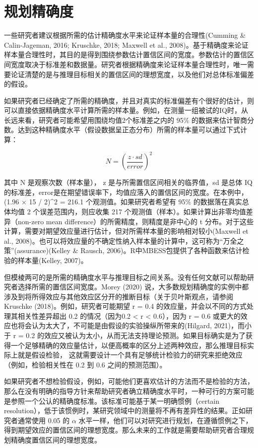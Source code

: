 \documentclass[
  letterpaper,
  DIV=11,
  numbers=noendperiod]{scrreprt}
\begin{document}
\hypertarget{planprecision}{%
\section{规划精确度}\label{planprecision}}

一些研究者建议根据所需的估计精确度水平来论证样本量的合理性(Cumming \&
Calin-Jageman, 2016; Kruschke, 2018; Maxwell et al.,
2008)。基于精确度来论证样本量合理性时，其目的是得到围绕参数估计置信区间的宽度。参数估计的置信区间宽度取决于标准差和数据量。研究者根据精确度来论证样本量合理性时，唯一需要论证清楚的是与推理目标相关的置信区间的理想宽度，以及他们对总体标准偏差的假设。

如果研究者已经确定了所需的精确度，并且对真实的标准偏差有个很好的估计，则可以直接依据精确度水平计算所需的样本量。例如，在测量一组被试的IQ时，从长远来看，研究者可能希望用围绕均值2个标准差之内的
95\%
的数据来估计智商分数。达到这种精确度水平（假设数据呈正态分布）所需的样本量可以通过下式计算：

\[N = \left(\frac{z \cdot sd}{error}\right)^2\]

其中 N 是观察次数（样本量）， z 是与所需置信区间相关的临界值，sd 是总体
IQ
的标准差，error是在期望错误率下，均值应落入的置信区间的宽度。在本例中，(1.96
× 15 / 2)\^{}2 = 216.1 个观测值。如果研究者希望有 95\%
的数据落在真实总体均值 2 个误差范围内，则应收集 217
个观测值（样本）。如果计算出非零均值差异（non-zero mean
difference）的所需精度，则精度是非中心的 t
分布。对于这些计算，需要对期望效应量进行估计，但对所需样本量的影响相对较小(Maxwell
et al.,
2008)。也可以将效应量的不确定性纳入样本量的计算中，这可称为``万全之策''(assurance)(Kelley
\& Rausch, 2006)。R中MBESS包提供了各种函数来估计检验的样本量(Kelley,
2007)。

但模棱两可的是所需的精确度水平与推理目标之间关系。没有任何文献可以帮助研究者选择所需的置信区间宽度。Morey
(2020)
说，大多数规划精确度的实例中都涉及到将所得效应与其他效应区分开的推断目标（关于贝叶斯观点，请参阅
Kruschke (2018)。例如，研究者可能期望 r = 0.4
的效应量，并会以不同的方式处理其相关性差异超出 0.2 的情况（因为0.2
\textless{} r \textless{} 0.6），因为 r = 0.6
或更大的效应也将会认为太大了，不可能是由假设的实验操纵所带来的(Hilgard,
2021)，而小于 r = 0.2
的效应又被认为太小，从而无法支持理论预测。如果目标确实是为了获得一个足够精确的效应量估计，以便高概率的区分上述两种效应，那么推理目标实际上就是假设检验，
这就需要设计一个具有足够统计检验力的研究来拒绝效应（例如，检验相关性在
0.2 到 0.6 之间的预测范围）。

如果研究者不想检验假设，例如，可能他们更喜欢估计的方法而不是检验的方法，那么在没有明确的指导方针来帮助研究者确立精确度水平时，一种可行的方案可能是参照一个公认的精确度标准。该标准可能基于某一明确惯例（certain
resolution），低于该惯例时，某研究领域中的测量将不再有差异性的结果。正如研究者通常使用
0.05 的 \(\alpha\)
水平一样，他们可以对研究进行规划，在遵循惯例之下，得到期望效应的置信区间的理想宽度。那么未来的工作就是需要帮助研究者合理规划精确度置信区间的理想宽度。
\end{document}
